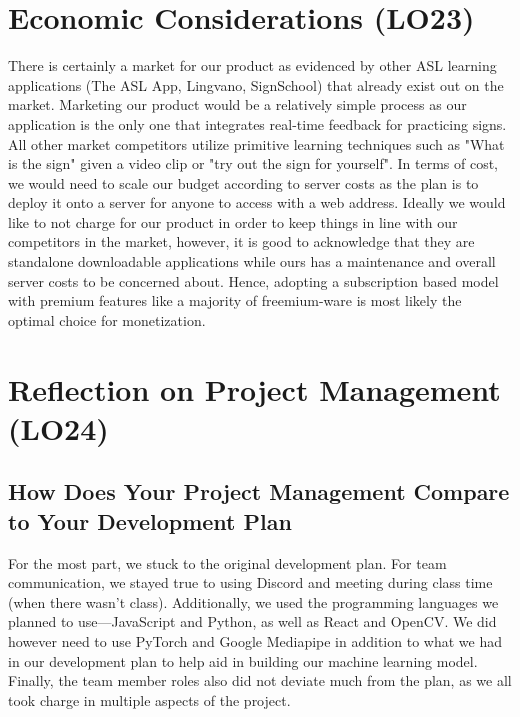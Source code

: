 \documentclass{article}
\begin{document}
\section{Economic Considerations (LO23)}


There is certainly a market for our product as evidenced by other ASL learning applications (The ASL App, Lingvano, SignSchool) that already exist out on the market. Marketing our product would be a relatively simple process as our application is the only one that integrates real-time feedback for practicing signs. All other market competitors utilize primitive learning techniques such as "What is the sign" given a video clip or "try out the sign for yourself". In terms of cost, we would need to scale our budget according to server costs as the plan is to deploy it onto a server for anyone to access with a web address. Ideally we would like to not charge for our product in order to keep things in line with our competitors in the market, however, it is good to acknowledge that they are standalone downloadable applications while ours has a maintenance and overall server costs to be concerned about. Hence, adopting a subscription based model with premium features like a majority of freemium-ware is most likely the optimal choice for monetization.

\section{Reflection on Project Management (LO24)}

\subsection{How Does Your Project Management Compare to Your Development Plan}

For the most part, we stuck to the original development plan. For team communication, we stayed true to using Discord and meeting during class time (when there wasn't class). Additionally, we used the programming languages we planned to use---JavaScript and Python, as well as React and OpenCV. We did however need to use PyTorch and Google Mediapipe in addition to what we had in our development plan to help aid in building our machine learning model. Finally, the team member roles also did not deviate much from the plan, as we all took charge in multiple aspects of the project.
\end{document}
